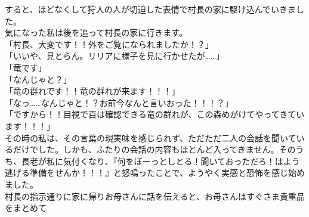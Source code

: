 \documentclass[oneside, a4paper]{jsbook}
\begin{document}
すると、ほどなくして狩人の人が切迫した表情で村長の家に駆け込んでいきました。\\
気になった私は後を追って村長の家に行きます。\\

\noindent
「村長、大変です！！外をご覧になられましたか！？」\\
「いいや、見とらん。リリアに様子を見に行かせたが……」\\
「竜です」\\
「なんじゃと？」\\
「竜の群れです！！竜の群れが来ます！！！」\\
「なっ……なんじゃと！？お前今なんと言いおった！！！？」\\
「ですから！！目視で百は確認できる竜の群れが、この森めがけてやってきています！！！」\\

その時の私は、その言葉の現実味を感じられず、ただただ二人の会話を聞いているだけでした。しかも、ふたりの会話の内容もほとんど入ってきません。そのうち、長老が私に気付くなり、『何をぼーっとしとる！聞いておっただろ！はよう逃げる準備をせんか！！！』と怒鳴ったことで、ようやく実感と恐怖を感じ始めました。\\

村長の指示通りに家に帰りお母さんに話を伝えると、お母さんはすぐさま貴重品をまとめて
\end{document}
